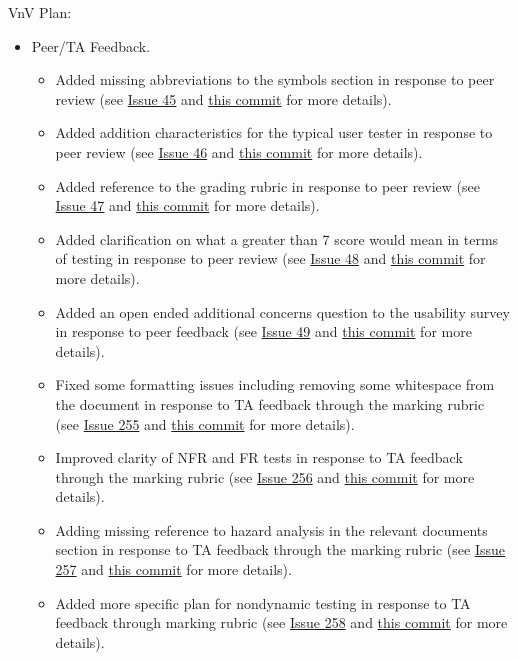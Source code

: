 \documentclass{article}
\begin{document}
VnV Plan:
\begin{itemize}
	\item Peer/TA Feedback.
	\begin{itemize}
		\item Added missing abbreviations to the symbols section in response to peer review (see \href{https://github.com/davimang/REACH/issues/45}{Issue 45} and \href{https://github.com/davimang/REACH/commit/ed1e1b779a09e4f9307eda85c31f5c630c82901a}{this commit} for more details).
		\item Added addition characteristics for the typical user tester in response to peer review (see \href{https://github.com/davimang/REACH/issues/46}{Issue 46} and \href{https://github.com/davimang/REACH/commit/fddfee5364754dc5f378b798aa95c6b2c8936416}{this commit} for more details).
		\item Added reference to the grading rubric in response to peer review (see \href{https://github.com/davimang/REACH/issues/47}{Issue 47} and \href{https://github.com/davimang/REACH/commit/88505588e5dba20dca6da5269ea3a9d1a4790b0b}{this commit} for more details).
		\item Added clarification on what a greater than 7 score would mean in terms of testing in response to peer review (see \href{https://github.com/davimang/REACH/issues/48}{Issue 48} and \href{https://github.com/davimang/REACH/commit/b0e38a2fd6e89f05ef0aa6bf5e46b53227dce24f}{this commit} for more details).
		\item Added an open ended additional concerns question to the usability survey in response to peer feedback (see \href{https://github.com/davimang/REACH/issues/49}{Issue 49} and \href{https://github.com/davimang/REACH/commit/10b7cbf6ab0c7e78344dd1dff75ae76adf6cd4c2}{this commit} for more details).
		\item Fixed some formatting issues including removing some whitespace from the document in response to TA feedback through the marking rubric (see \href{https://github.com/davimang/REACH/issues/255}{Issue 255} and \href{https://github.com/davimang/REACH/commit/ad4b67e9f87e89c4d2c1a409db14da7401b8f39c}{this commit} for more details).
		\item Improved clarity of NFR and FR tests in response to TA feedback through the marking rubric (see \href{https://github.com/davimang/REACH/issues/256}{Issue 256} and \href{https://github.com/davimang/REACH/commit/ce52fb62cb65dd884ee3c7afac4c7a684d84b771}{this commit} for more details).
		\item Adding missing reference to hazard analysis in the relevant documents section in response to TA feedback through the marking rubric (see \href{https://github.com/davimang/REACH/issues/257}{Issue 257} and \href{https://github.com/davimang/REACH/commit/396e5df0a6208758a45054c8e35b35d37d1cc25f}{this commit} for more details).
		\item Added more specific plan for nondynamic testing in response to TA feedback through marking rubric (see \href{https://github.com/davimang/REACH/issues/258}{Issue 258} and \href{https://github.com/davimang/REACH/commit/3a46bc35ff31855f752df09efb5f4dd5fa4211c7}{this commit} for more details).
	\end{itemize}
\end{itemize}
\end{document}
